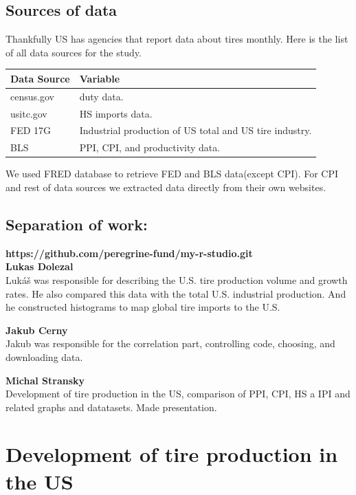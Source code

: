 \documentclass{article}
\begin{document}
\subsection*{Sources of data}
Thankfully US has agencies that report data about tires monthly. Here is the list of all data sources for the study.
\begin{center}
\renewcommand{\arraystretch}{1.5} %
\begin{tabular}{|l|p{10cm}|}
\hline
\textbf{Data Source} & \textbf{Variable} \\ \hline
census.gov & duty data. \\ \hline
usitc.gov & HS imports data. \\ \hline
FED 17G & Industrial production of US total and US tire industry. \\ \hline
BLS & PPI, CPI, and productivity data. \\ \hline
\end{tabular}

\small{We used FRED database to retrieve FED and BLS data(except CPI). For CPI and rest of data sources we extracted data directly from their own websites.}
\end{center}

\subsection*{Separation of work:}
\textbf{https://github.com/peregrine-fund/my-r-studio.git}\\


\textbf{Lukas Dolezal} \\
Lukáš was responsible for describing the U.S. tire production volume and growth rates. He also compared this data with the total U.S. industrial production. And he constructed histograms to map global tire imports to the U.S.

\textbf{Jakub Cerny} \\
Jakub was responsible for the correlation part, controlling code, choosing, and downloading data.

\textbf{Michal Stransky} \\
Development of tire production in the US, comparison of PPI, CPI, HS a IPI and related graphs and datatasets. Made presentation.


\section{Development of tire production in the US }
\end{document}
